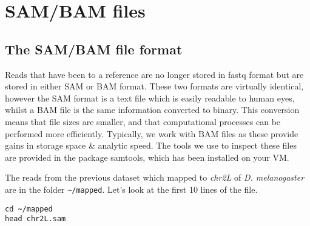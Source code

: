 \chapter{SAM/BAM files}

\section{The SAM/BAM file format}
\begin{information}
Reads that have been to a reference are no longer stored in fastq format but are stored in either SAM or BAM format.
These two formats are virtually identical, however the SAM format is a text file which is easily readable to human eyes, whilst a BAM file is the same information converted to binary.
This conversion means that file sizes are smaller, and that computational processes can be performed more efficiently.
Typically, we work with BAM files as these provide gains in storage space \& analytic speed.
The tools we use to inspect these files are provided in the package samtools, which has been installed on your VM. \\
\end{information}

\begin{steps}
The reads from the previous dataset which mapped to \textit{chr2L} of \textit{D. melanogaster} are in the folder \texttt{\~{}/mapped}.
Let's look at the first 10 lines of the file.
\begin{lstlisting}
cd ~/mapped
head chr2L.sam  
\end{lstlisting}
\end{steps}

